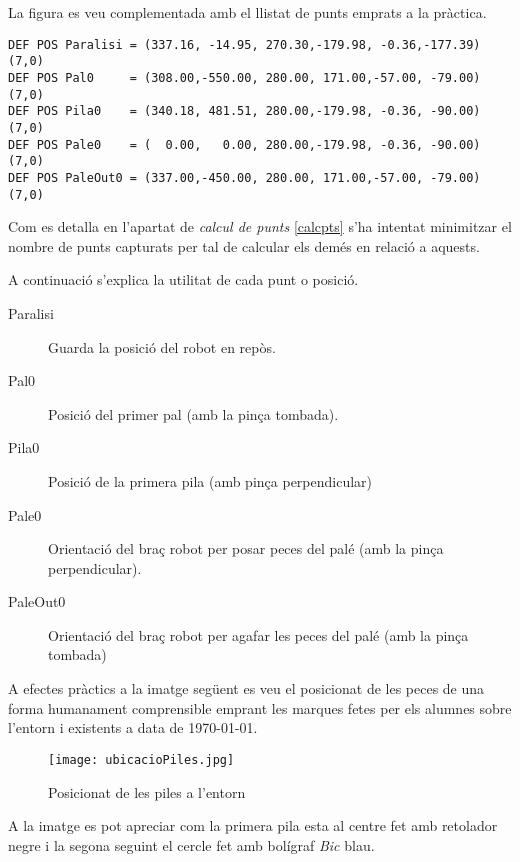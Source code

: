 La figura es veu complementada amb el llistat de punts emprats a la pràctica.

\begin{verbatim}
DEF POS Paralisi = (337.16, -14.95, 270.30,-179.98, -0.36,-177.39)(7,0)
DEF POS Pal0     = (308.00,-550.00, 280.00, 171.00,-57.00, -79.00)(7,0)
DEF POS Pila0    = (340.18, 481.51, 280.00,-179.98, -0.36, -90.00)(7,0)
DEF POS Pale0    = (  0.00,   0.00, 280.00,-179.98, -0.36, -90.00)(7,0)
DEF POS PaleOut0 = (337.00,-450.00, 280.00, 171.00,-57.00, -79.00)(7,0)
\end{verbatim}

Com es detalla en l'apartat de \emph{calcul de punts} \ref{calcpts}
s'ha intentat minimitzar el nombre de punts capturats per tal
de calcular els demés en relació a aquests.

A continuació s'explica la utilitat de cada punt o posició.

\begin{description}
 \item [Paralisi] Guarda la posició del robot en repòs.
 \item [Pal0] Posició del primer pal (amb la pinça tombada).
 \item [Pila0] Posició de la primera pila (amb pinça perpendicular)
 \item [Pale0] Orientació del braç robot per posar peces del palé (amb la pinça
perpendicular).
 \item [PaleOut0] Orientació del braç robot per agafar les peces del palé
(amb la pinça tombada) 
\end{description}

A efectes pràctics a la imatge següent es veu el posicionat de les peces de una forma
humanament comprensible emprant les marques fetes per els alumnes sobre l'entorn i existents
a data de \today. 

\begin{figure}[H]
\begin{center}\label{fig:palmog}
 \texttt{[image: ubicacioPiles.jpg]}
\end{center}
  \caption{Posicionat de les piles a l'entorn}
\end{figure}

A la imatge es pot apreciar com la primera pila esta al centre fet amb
retolador negre i la segona seguint el cercle fet amb bolígraf \emph{Bic} blau.

